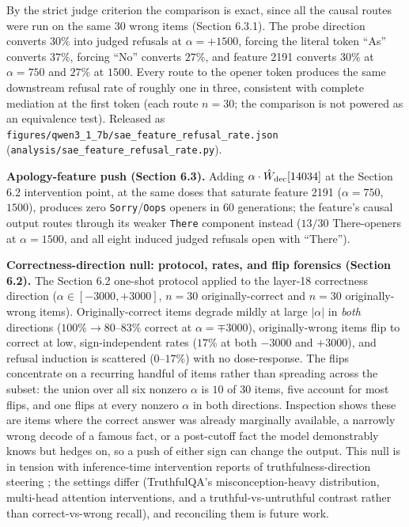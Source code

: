 By the strict judge criterion the comparison is exact, since all the
causal routes were run on the same \(30\) wrong items (Section 6.3.1).
The probe direction converts \(30\%\) into judged refusals at
\(\alpha = +1500\), forcing the literal token ``As'' converts \(37\%\),
forcing ``No'' converts \(27\%\), and feature 2191 converts \(30\%\) at
\(\alpha = 750\) and \(27\%\) at \(1500\). Every route to the opener
token produces the same downstream refusal rate of roughly one in three,
consistent with complete mediation at the first token (each route
\(n=30\); the comparison is not powered as an equivalence test).
Released as
\texttt{figures/qwen3\_1\_7b/sae\_feature\_refusal\_rate.json}
(\texttt{analysis/sae\_feature\_refusal\_rate.py}).

\textbf{Apology-feature push (Section 6.3).} Adding
\(\alpha \cdot \hat W_{\rm dec}[14034]\) at the Section 6.2 intervention
point, at the same doses that saturate feature 2191 (\(\alpha = 750\),
\(1500\)), produces zero \texttt{Sorry}/\texttt{Oops} openers in \(60\)
generations; the feature's causal output routes through its weaker
\texttt{There} component instead (\(13/30\) There-openers at
\(\alpha = 1500\), and all eight induced judged refusals open with
``There'').

\textbf{Correctness-direction null: protocol, rates, and flip forensics
(Section 6.2).} The Section 6.2 one-shot protocol applied to the
layer-18 correctness direction (\(\alpha \in [-3000, +3000]\), \(n=30\)
originally-correct and \(n=30\) originally-wrong items).
Originally-correct items degrade mildly at large
\(|\alpha|\) in \emph{both} directions (\(100\% \to 80\)--\(83\%\)
correct at \(\alpha = \mp 3000\)), originally-wrong items flip to
correct at low, sign-independent rates (\(17\%\) at both \(-3000\) and
\(+3000\)), and refusal induction is scattered (\(0\)--\(17\%\)) with no
dose-response. The flips concentrate on a recurring handful of items
rather than spreading across the subset: the union over all six nonzero
\(\alpha\) is \(10\) of \(30\) items, five account for most flips, and
one flips at every nonzero \(\alpha\) in both directions. Inspection
shows these are items where the correct answer was already marginally
available, a narrowly wrong decode of a famous fact, or a post-cutoff fact the model demonstrably knows but hedges on, so a push of either sign can change the output. This null is in
tension with inference-time intervention reports of
truthfulness-direction steering \citep{li2023iti}; the settings differ
(TruthfulQA's misconception-heavy distribution, multi-head attention
interventions, and a truthful-vs-untruthful contrast rather than
correct-vs-wrong recall), and reconciling them is future work.

